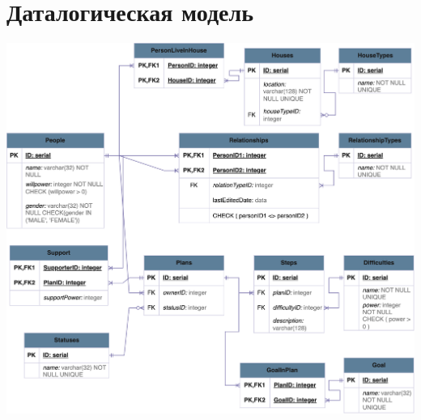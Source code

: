 \documentclass[12pt,onecolumn]{article}
\begin{document}
\section{Даталогическая модель}
\includegraphics[width=\textwidth]{image/datalogical-model.png}
\newpage
\end{document}
